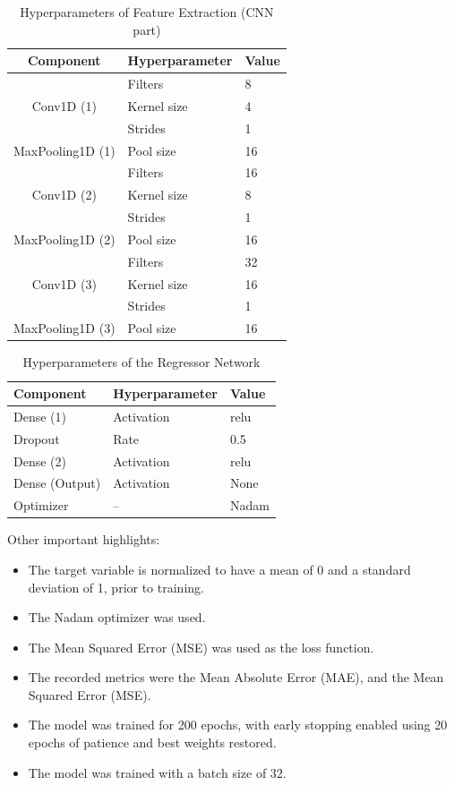 \documentclass[10pt,conference]{IEEEtran}
\begin{document}
\begin{table} \small \centering
  \caption{Hyperparameters of Feature Extraction (CNN part)}
  \label{tab:hyperparams_cnn}
  \begin{tabular}{cll}
    \toprule
    Component & Hyperparameter & Value \\
    \midrule
    \multirow{3}{*}{Conv1D (1)} 
        & Filters & 8 \\
        & Kernel size & 4 \\
        & Strides & 1 \\
    MaxPooling1D (1) & Pool size & 16 \\
    \multirow{3}{*}{Conv1D (2)} 
        & Filters & 16 \\
        & Kernel size & 8 \\
        & Strides & 1 \\
    MaxPooling1D (2) & Pool size & 16 \\
    \multirow{3}{*}{Conv1D (3)} 
        & Filters & 32 \\
        & Kernel size & 16 \\
        & Strides & 1 \\
    MaxPooling1D (3) & Pool size & 16 \\
    \bottomrule
  \end{tabular}
\end{table}


\begin{table} \small \centering
  \caption{Hyperparameters of the Regressor Network}
  \label{tab:hyperparams_regressor}
  \begin{tabular}{lll}
    \toprule
    Component & Hyperparameter & Value \\
    \midrule
    \multirow{1}{*}{Dense (1)} 
        & Activation & relu \\
    Dropout & Rate & 0.5 \\
    \multirow{1}{*}{Dense (2)} 
        & Activation & relu \\
    \multirow{1}{*}{Dense (Output)} 
        & Activation & None \\
    Optimizer & -- & Nadam \\
    \bottomrule
  \end{tabular}
\end{table}

Other important highlights:

\begin{itemize}
    \item The target variable is normalized to have a mean of 0 and a standard deviation of 1, prior to training.
    \item The Nadam optimizer was used.
    \item The Mean Squared Error (MSE) was used as the loss function.
    \item The recorded metrics were the Mean Absolute Error (MAE), and the Mean Squared Error (MSE).
    \item The model was trained for 200 epochs, with early stopping enabled using 20 epochs of patience and best weights restored.
    \item The model was trained with a batch size of 32.
\end{itemize}
\end{document}
